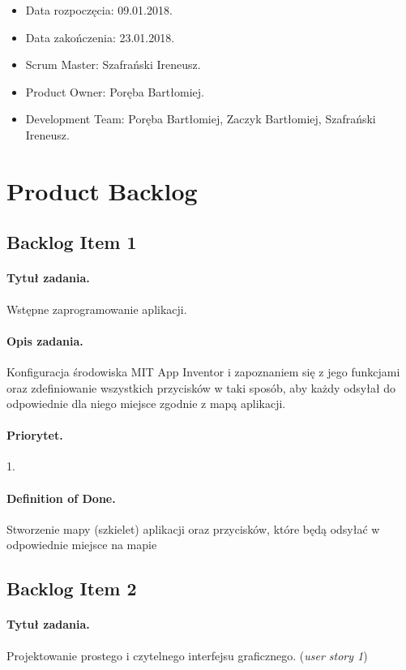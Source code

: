 \documentclass[a4paper]{article}
\begin{document}
	\begin{itemize}
		\item Data rozpoczęcia: 09.01.2018.
		\item  Data zakończenia: 23.01.2018.
		\item Scrum Master: Szafrański Ireneusz.
		\item Product Owner: Poręba Bartłomiej.
		\item Development Team: Poręba Bartłomiej, Zaczyk Bartłomiej, Szafrański Ireneusz.
	\end{itemize}
	
	
	\section{Product Backlog}
	
	\subsection{Backlog Item 1}
	\paragraph{Tytuł zadania.} Wstępne zaprogramowanie aplikacji.
	\paragraph{Opis zadania.} Konfiguracja środowiska MIT App Inventor i zapoznaniem się z jego funkcjami oraz zdefiniowanie wszystkich przycisków w taki sposób, aby każdy odsyłał do odpowiednie dla niego miejsce zgodnie z mapą aplikacji.
	\paragraph{Priorytet.} 1.
	\paragraph{Definition of Done.} Stworzenie mapy (szkielet) aplikacji oraz przycisków, które będą odsyłać w odpowiednie miejsce na mapie
	
	\subsection{Backlog Item 2}
	\paragraph{Tytuł zadania.} Projektowanie prostego i czytelnego interfejsu graficznego. (\textit{user story 1})
\end{document}
